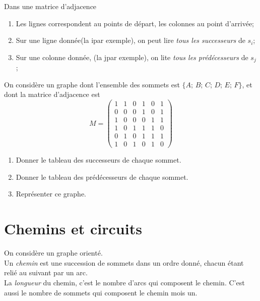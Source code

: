 \documentclass[a4paper,12pt]{book}
\begin{document}
\begin{remarque}[]
Dans une matrice d'adjacence\begin{enumerate}[--]
	\item 	Les lignes correspondent au points de départ, les colonnes au point d'arrivée;
	\item 	Sur une ligne donnée(la i\eme par exemple), on peut lire \textit{tous les successeurs} de $s_i$;
	\item 	Sur une colonne donnée, (la j\eme par exemple), on lite \textit{tous les prédécesseurs} de $s_j$;
\end{enumerate}
\end{remarque}

\begin{exercice}[]
On considère un graphe dont l'ensemble des sommets est $\{A;\,B;\,C;\,D;\,E;\,F\}$, et dont la matrice d'adjacence est
$$ M=\begin{pmatrix}
1 &1 &0 & 1&0&1  \\
0 & 0&0 &1 &0&1  \\
1 & 0 & 0 & 0 & 1&1\\
1 & 0 & 1 & 1 & 1&0\\
0 & 1 & 0 &1 & 1 &1\\
1 & 0 &1 & 0 &1& 0
\end{pmatrix}$$

\begin{enumerate}[\bfseries 1.]
	\item 	Donner le tableau des successeurs de chaque sommet.
	\item 	Donner le tableau des prédécesseurs de chaque sommet.
	\item 	Représenter ce graphe.
\end{enumerate}
\end{exercice}

\section{Chemins et circuits}

\begin{definition}

On considère un graphe orienté.\\
Un \textit{chemin} est une succession de sommets dans un ordre donné, chacun étant relié au suivant par un arc.\\
La \textit{longueur} du chemin, c'est le nombre d'arcs qui composent le chemin. C'est aussi le nombre de sommets qui composent le chemin mois un.
\end{definition}
\end{document}
